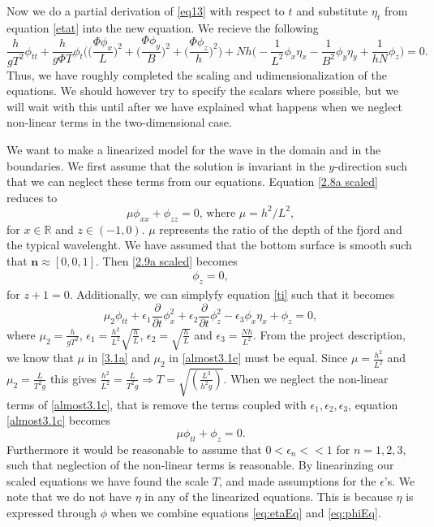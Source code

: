 \documentclass[11pt]{article}
\begin{document}
Now we do a partial derivation of \eqref{eq13} with respect to $t$ and substitute $\eta_t$ from equation \eqref{etat} into the new equation. We recieve the following
\begin{equation} \label{ti}
\frac{ h}{ g T^2 } \phi_{tt}+ \frac{h}{g \Phi T} \phi_t\bigg(\Big(\frac{\Phi \phi_x}{L}\Big)^2+\Big(\frac{\Phi \phi_y}{B}\Big)^2+\Big(\frac{\Phi \phi_z}{h}\Big)^2\bigg) + Nh\bigg(-\frac{1}{L^2} \phi_x  \eta_x - \frac{1}{B^2} \phi_y \eta_y + \frac{1}{hN} \phi_z \bigg) = 0.
\end{equation}
Thus, we have roughly completed the scaling and udimensionalization of the equations. We should however try to specify the scalars where possible, but we will wait with this until after we have explained what happens when we neglect non-linear terms in the two-dimensional case.


We want to make a linearized model for the wave in the domain and in the boundaries. We first assume that the solution is invariant in the $y$-direction such that we can neglect these terms from our equations. Equation \eqref{2.8a scaled} reduces to 
\begin{equation} \label{3.1a}
\mu \phi_{xx} + \phi_{zz} = 0\text{, where }\mu = h^2/L^2,
\end{equation}
for $x \in \mathbb{R}$ and $z \in (-1,0)$. $\mu$ represents the ratio of the depth of the fjord and the typical wavelenght.  We have assumed that the bottom surface is smooth such that  $\bm{n} \approx [0,0,1]$. Then \eqref{2.9a scaled} becomes
\begin{align*}
\phi_z = 0,
\end{align*}
for $z +1 = 0$.
Additionally, we can simplyfy equation \eqref{ti} such that it becomes
\begin{equation} \label{almost3.1c}
\mu_2 \phi_{tt} + \epsilon_1 \frac{\partial }{\partial t} \phi_x^2+ \epsilon_2 \frac{\partial }{\partial t}\phi_z^2 - \epsilon_3 \phi_x  \eta_x +  \phi_z  = 0,
\end{equation}
where $\mu_2=\frac{h}{gT^2}$, $\epsilon_1= \frac{h^2}{L^2} \sqrt{\frac{h}{L}}$, $\epsilon_2=\sqrt{\frac{h}{L}}$ and $\epsilon_3=\frac{Nh}{L^2}$.
From the project description, we know that $\mu$ in \eqref{3.1a} and $\mu_2$ in \eqref{almost3.1c} must be equal. Since $\mu=\frac{h^2}{L^2}$ and $\mu_2=\frac{L}{T^2g}$ this gives $\frac{h^2}{L^2}=\frac{L}{T^2g} \Rightarrow T=\sqrt{(\frac{L^3}{h^2g})}$.
When we neglect the non-linear terms of \eqref{almost3.1c}, that is remove the terms coupled with $\epsilon_1, \epsilon_2, \epsilon_3$, equation \eqref{almost3.1c} becomes
\begin{equation*}
\mu \phi_{tt}+ \phi_z=0.
\end{equation*}
Furthermore it would be reasonable to assume that $0<\epsilon_n<<1$ for $n=1,2,3$, such that neglection of the non-linear terms is reasonable. By linearinzing our scaled equations we have found the scale $T$, and made assumptions for the $\epsilon$'s. We note that we do not have $\eta$ in any of the linearized equations. This is because $\eta$ is expressed through $\phi$ when we combine equations \eqref{eq:etaEq} and \eqref{eq:phiEq}.
\end{document}
